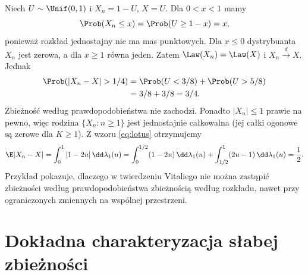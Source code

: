 \begin{przyklad}
Niech $U\sim\Unif(0,1)$ i $X_n=1-U$, $X=U$.
Dla $0<x<1$ mamy
\[
\Prob(X_n\leq x)=\Prob(U\geq1-x)=x,
\]
ponieważ rozkład jednostajny nie ma mas punktowych.
Dla $x\leq0$ dystrybuanta $X_n$ jest zerowa,
a dla $x\geq1$ równa jeden. Zatem
$\Law(X_n)=\Law(X)$ i $X_n\xrightarrow{d}X$.
Jednak
\[
\begin{aligned}
\Prob(|X_n-X|>1/4)
&=\Prob(U<3/8)+\Prob(U>5/8)\\
&=3/8+3/8=3/4.
\end{aligned}
\]
Zbieżność według prawdopodobieństwa nie zachodzi.
Ponadto $|X_n|\leq1$ prawie na pewno, więc rodzina
$\{X_n:n\geq1\}$ jest jednostajnie całkowalna
(jej całki ogonowe są zerowe dla $K\geq1$).
Z wzoru \eqref{eq:lotus} otrzymujemy
\[
\E|X_n-X|
=\int_0^1|1-2u|\,\dd\lambda_1(u)
=\int_0^{1/2}(1-2u)\,\dd\lambda_1(u)
+\int_{1/2}^1(2u-1)\,\dd\lambda_1(u)=\frac12.
\]
Przykład pokazuje, dlaczego w twierdzeniu Vitaliego
nie można zastąpić zbieżności według prawdopodobieństwa
zbieżnością według rozkładu, nawet przy ograniczonych
zmiennych na wspólnej przestrzeni.
\end{przyklad}

\section{Dokładna charakteryzacja słabej zbieżności}

